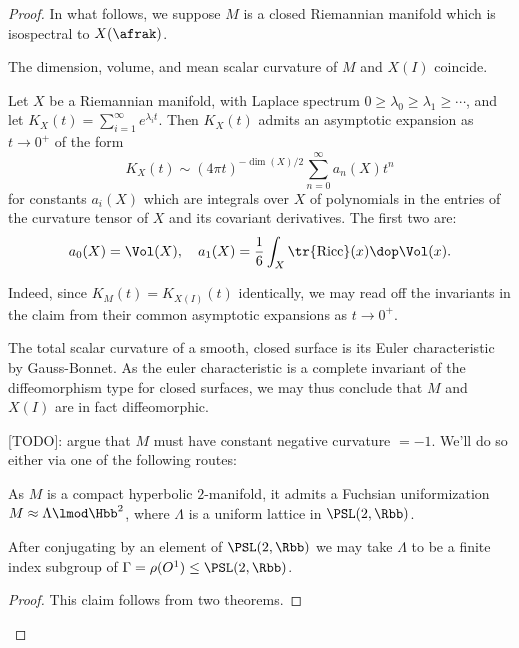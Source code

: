 \begin{proof}
  In what follows, we suppose $M$ is a closed Riemannian manifold which is isospectral to $X(\afrak)$.

  \begin{claim}\label{claim:heat}
    The dimension, volume, and mean scalar curvature of $M$ and $X(I)$ coincide.
  \end{claim}



  \begin{lemma}
    Let $X$ be a Riemannian manifold, with Laplace spectrum $0\geq \lambda_0 \geq \lambda_1 \geq \cdots$, and let $K_X(t)=\sum_{i=1}^\infty e^{\lambda_i t}$. Then $K_X(t)$ admits an asymptotic expansion as $t\to 0^+$ of the form
    \[ K_X(t) \sim (4\pi t)^{-\dim(X)/2} \sum_{n=0}^\infty a_n(X) t^n \]
    for constants $a_i(X)$ which are integrals over $X$ of polynomials in the entries of the curvature tensor of $X$ and its covariant derivatives. The first two are:
    \[a_0(X) = \Vol(X),\quad a_1(X) = \frac{1}{6} \int_X \tr {\rm Ricc} (x) \dop \Vol(x).\]
  \end{lemma}

  Indeed, since $K_M(t) = K_{X(I)}(t)$ identically, we may read off the invariants in the claim from their common asymptotic expansions as $t\to 0^+$.
  \begin{rem}
    The total scalar curvature of a smooth, closed surface is its Euler characteristic by Gauss-Bonnet. As the euler characteristic is a complete invariant of the diffeomorphism type for closed surfaces, we may thus conclude that $M$ and $X(I)$ are in fact diffeomorphic.
  \end{rem}

  [TODO]: argue that $M$ must have constant negative curvature $=-1$. We'll do so either via one of the following routes:


  As $M$ is a compact hyperbolic $2$-manifold, it admits a Fuchsian uniformization $M \approx \Lambda \lmod \Hbb^2$, where $\Lambda$ is a uniform lattice in $\PSL(2,\Rbb)$.
  \begin{claim}
    After conjugating by an element of $\PSL(2,\Rbb)$ we may take $\Lambda$ to be a finite index subgroup of $\Gamma = \rho(O^1) \leq  \PSL(2,\Rbb)$.
  \end{claim}
  \begin{proof}
    This claim follows from two theorems.


\end{proof}
\end{proof}
